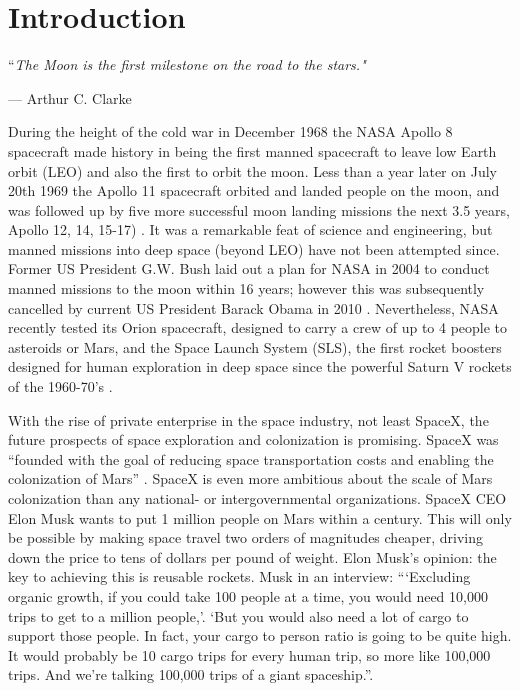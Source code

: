 \chapter{Introduction}
\epigraph{``\itshape{The Moon is the first milestone on the road to the stars.}"}{--- \textup{Arthur C. Clarke}}

During the height of the cold war in December 1968 the NASA Apollo 8 spacecraft made history in being the first manned spacecraft to leave low Earth orbit (LEO) and also the first to orbit the moon. Less than a year later on July 20th 1969 the Apollo 11 spacecraft orbited and landed people on the moon, and was followed up by five more successful moon landing missions the next 3.5 years, Apollo 12, 14, 15-17) \cite{wiki-moon-missions}. It was a remarkable feat of science and engineering, but manned missions into deep space (beyond LEO) have not been attempted since. Former US President G.W. Bush laid out a plan for NASA in 2004 to conduct manned missions to the moon within 16 years; however this was subsequently cancelled by current US President Barack Obama in 2010 \cite{cnn-bush-moon}\cite{bcc-obama-moon}. Nevertheless, NASA recently tested its Orion spacecraft, designed to carry a crew of up to 4 people to asteroids or Mars, and the Space Launch System (SLS), the first rocket boosters designed for human exploration in deep space since the powerful Saturn V rockets of the 1960-70's \cite{nasa-sls}.

With the rise of private enterprise in the space industry, not least SpaceX, the future prospects of space exploration and colonization is promising. SpaceX was “founded with the goal of reducing space transportation costs and enabling the colonization of Mars” \cite{wiki-spacex}. SpaceX is even more ambitious about the scale of Mars colonization than any national- or intergovernmental organizations. SpaceX CEO Elon Musk wants to put 1 million people on Mars within a century. This will only be possible by making space travel two orders of magnitudes cheaper, driving down the price to tens of dollars per pound of weight. Elon Musk's opinion: the key to achieving this is reusable rockets. Musk in an interview: “‘Excluding organic growth, if you could take 100 people at a time, you would need 10,000 trips to get to a million people,’. ‘But you would also need a lot of cargo to support those people. In fact, your cargo to person ratio is going to be quite high. It would probably be 10 cargo trips for every human trip, so more like 100,000 trips. And we’re talking 100,000 trips of a giant spaceship.”\cite{RossAndersen}.

